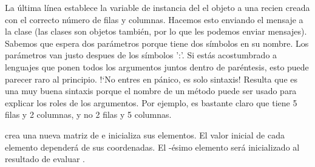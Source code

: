 \documentclass[a4paper,10pt,twoside]{book}
\begin{document}
La \'ultima l\'inea establece la variable de instancia  del el objeto  a una recien creada  con el correcto n\'umero de filas y columnas. Hacemos esto enviando el mensaje  a la clase  (las clases son objetos tambi\'en, por lo que les podemos enviar mensajes). Sabemos que  espera dos par\'ametros porque tiene dos s\'imbolos \ct{:} en su nombre. Los par\'ametros van justo despues de los s\'imbolos ':'.
Si est\'as acostumbrado a lenguajes que ponen todos los argumentos juntos dentro de par\'entesis, esto puede parecer raro al principio. !`No entres en p\'anico, es solo sintaxis!
Resulta que es una muy buena sintaxis porque el nombre de un m\'etodo puede ser usado para explicar los roles de los argumentos. Por ejemplo, es bastante claro que  tiene 5 filas y 2 columnas, y no 2 filas y 5 columnas. 


 crea una nueva matriz de  e inicializa sus elementos. El valor inicial de cada elemento depender\'a de sus coordenadas.  El -\'esimo elemento ser\'a inicializado al resultado de evaluar .
\end{document}
